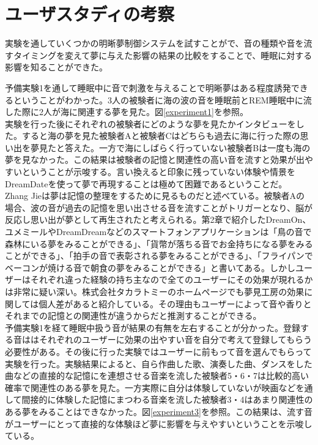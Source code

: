 \section{ユーザスタディの考察}

実験を通していくつかの明晰夢制御システムを試すことがで、音の種類や音を流すタイミングを変えて夢に与えた影響の結果の比較をすることで、睡眠に対する影響を知ることができた。

予備実験1を通して睡眠中に音で刺激を与えることで明晰夢はある程度誘発できるということがわかった。3人の被験者に海の波の音を睡眠前とREM睡眠中に流した際に2人が海に関連する夢を見た。図\ref{experiment1}を参照。\\

実験を行った後にそれぞれの被験者にどのような夢を見たかインタビューをした。すると海の夢を見た被験者Aと被験者Cはどちらも過去に海に行った際の思い出を夢見たと答えた。一方で海にしばらく行っていない被験者Bは一度も海の夢を見なかった。この結果は被験者の記憶と関連性の高い音を流すと効果が出やすいということが示唆する。言い換えると印象に残っていない体験や情景をDreamDateを使って夢で再現することは極めて困難であるということだ。\\

Zhang Jieは夢は記憶の整理をするために見るものだと述べている\cite{Zhang}。被験者Aの場合、波の音が過去の記憶を思い出させる音を流すことがトリガーとなり、脳が反応し思い出が夢として再生されたと考えられる。第2章で紹介したDreamOn、ユメミールやDreamDreamなどのスマートフォンアプリケーションは「鳥の音で森林にいる夢をみることができる」、「貨幣が落ちる音でお金持ちになる夢をみることができる」、「拍手の音で表彰される夢をみることができる」、「フライパンでベーコンが焼ける音で朝食の夢をみることができる」と書いてある。しかしユーザーはそれぞれ違った経験の持ち主なので全てのユーザーにその効果が現れるかは非常に疑い深い。株式会社タカラトミーのホームページでも夢見工房の効果に関しては個人差があると紹介している。その理由もユーザーによって音や香りとそれまでの記憶との関連性が違うからだと推測することができる。\\

予備実験1を経て睡眠中扱う音が結果の有無を左右することが分かった。登録する音ははそれぞれのユーザーに効果の出やすい音を自分で考えて登録してもらう必要性がある。その後に行った実験ではユーザーに前もって音を選んでもらって実験を行った。実験結果によると、自ら作曲した歌、演奏した曲、ダンスをした曲などの直接的な記憶にを連想させる音楽を流した被験者5・6・7は比較的高い確率で関連性のある夢を見た。一方実際に自分は体験していないが映画などを通して間接的に体験した記憶にまつわる音楽を流した被験者3・4はあまり関連性のある夢をみることはできなかった。図\ref{experiment3}を参照。この結果は、流す音がユーザーにとって直接的な体験ほど夢に影響を与えやすいということを示唆している。\\

